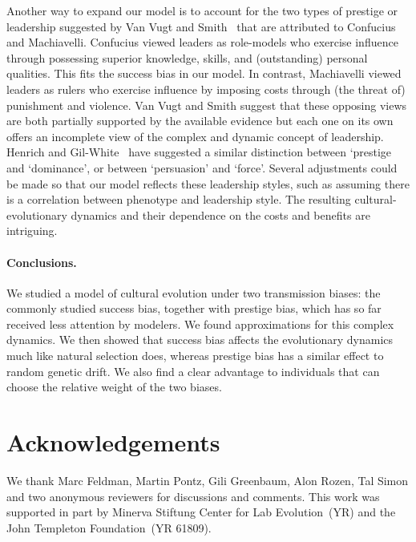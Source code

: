 \documentclass[12pt]{extarticle}
\begin{document}
Another way to expand our model is to account for the two types of prestige or leadership suggested by Van Vugt and Smith~\citep{dual_leadership} that are attributed to Confucius and Machiavelli. Confucius viewed leaders as role-models who exercise influence through possessing superior knowledge, skills, and (outstanding) personal qualities. This fits the success bias in our model. 
In contrast, Machiavelli viewed leaders as rulers who exercise influence by imposing costs through (the threat of) punishment and violence.
Van Vugt and Smith suggest that these opposing views are both partially supported by the available evidence but each one on its own offers an incomplete view of the complex and dynamic concept of leadership. 
Henrich and Gil-White~\citep{prestige_evolution} have suggested a similar distinction between `prestige and `dominance', or between `persuasion' and `force'.
Several adjustments could be made so that our model reflects these leadership styles, such as assuming there is a correlation between phenotype and leadership style. The resulting cultural-evolutionary dynamics and their dependence on the costs and benefits are intriguing.

\paragraph{Conclusions.}
We studied a model of cultural evolution under two transmission biases: the commonly studied success bias, together with prestige bias, which has so far received less attention by modelers. We found approximations for this complex dynamics. We then showed that success bias affects the evolutionary dynamics much like natural selection does, whereas prestige bias has a similar effect to random genetic drift. We also find a clear advantage to individuals that can choose the relative weight of the two biases.

{\small
\section*{Acknowledgements}
We thank Marc Feldman, Martin Pontz, Gili Greenbaum, Alon Rozen, Tal Simon and two anonymous reviewers for discussions and comments.
This work was supported in part by 
Minerva Stiftung Center for Lab Evolution~(YR) and  the John Templeton Foundation~(YR 61809).
}

\newpage 
\end{document}
